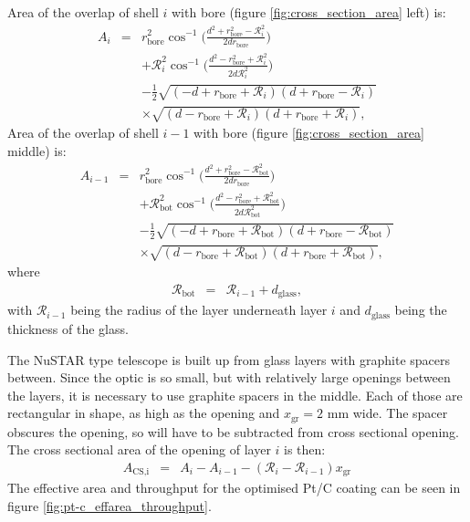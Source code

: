 Area of the overlap of shell $i$ with bore (figure \ref{fig:cross_section_area} left) is:
\begin{eqnarray}\label{eq:overlap1}
  A_{i} &=& r_{\text{bore}}^2\cos^{-1}\Big(\frac{d^2+r_{\text{bore}}^2-\mathcal{R}_{i}^2}{2dr_{\text{bore}}}\Big)\nonumber\\
  &&+\mathcal{R}_{i}^2\cos^{-1}\Big(\frac{d^2-r_{\text{bore}}^2+\mathcal{R}_{i}^2}{2d\mathcal{R}_{i}^2}\Big)\nonumber\\
  &&-\frac{1}{2}\sqrt{(-d+r_{\text{bore}}+\mathcal{R}_{i})(d+r_{\text{bore}}-\mathcal{R}_{i})}\nonumber\\
  &&\times\sqrt{(d-r_{\text{bore}}+\mathcal{R}_{i})(d+r_{\text{bore}}+\mathcal{R}_{i})},
\end{eqnarray}
Area of the overlap of shell $i-1$ with bore (figure \ref{fig:cross_section_area} middle) is:
\begin{eqnarray}\label{eq:overlap2}
  A_{i-1} &=& r_{\text{bore}}^2\cos^{-1}\Big(\frac{d^2+r_{\text{bore}}^2-\mathcal{R}_{\text{bot}}^2}{2dr_{\text{bore}}}\Big)\nonumber\\
  &&+\mathcal{R}_{\text{bot}}^2\cos^{-1}\Big(\frac{d^2-r_{\text{bore}}^2+\mathcal{R}_{\text{bot}}^2}{2d\mathcal{R}_{\text{bot}}^2}\Big)\nonumber\\
  &&-\frac{1}{2}\sqrt{(-d+r_{\text{bore}}+\mathcal{R}_{\text{bot}})(d+r_{\text{bore}}-\mathcal{R}_{\text{bot}})}\nonumber\\
  &&\times\sqrt{(d-r_{\text{bore}}+\mathcal{R}_{\text{bot}})(d+r_{\text{bore}}+\mathcal{R}_{\text{bot}})},
\end{eqnarray}
where
\begin{eqnarray}\label{eq:overlap3}
  \mathcal{R}_{\text{bot}} &=& \mathcal{R}_{i-1} + d_{\text{glass}},
\end{eqnarray}
with $\mathcal{R}_{i-1}$ being the radius of the layer underneath layer $i$ and $d_{\text{glass}}$ being the thickness of the glass.

The NuSTAR type telescope is built up from glass layers with graphite spacers between.  Since the optic is so small, but with relatively large openings between the layers, it is necessary to use graphite spacers in the middle. Each of those are rectangular in shape, as high as the opening and $x_{\text{gr}}=2$ mm wide. The spacer obscures the opening, so will have to be subtracted from cross sectional opening. The cross sectional area of the  opening of layer $i$ is then:
\begin{eqnarray}
  A_{\text{CS,i}} &=& A_{i} - A_{i-1} - (\mathcal{R}_{i}-\mathcal{R}_{i-1})x_{\text{gr}}
\end{eqnarray}
The effective area and throughput for the optimised Pt/C coating can be seen in figure \ref{fig:pt-c_effarea_throughput}.

